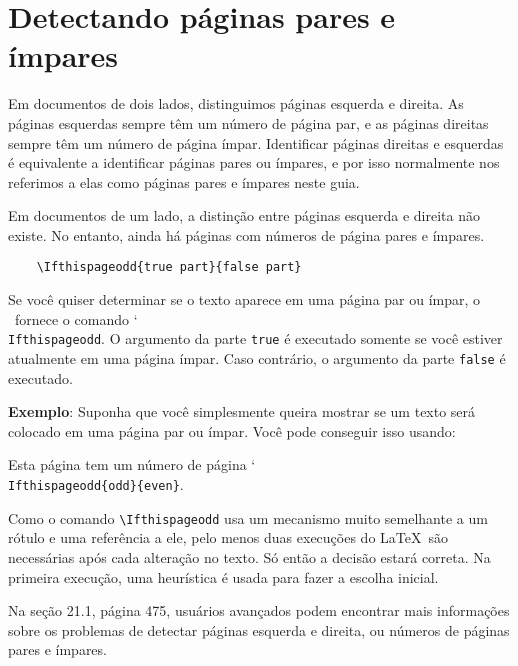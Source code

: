 \chapter{Detectando páginas pares e ímpares}
Em documentos de dois lados, distinguimos páginas esquerda e direita. As páginas esquerdas sempre têm um número de página par, e as páginas direitas sempre têm um número de página ímpar. Identificar páginas direitas e esquerdas é equivalente a identificar páginas pares ou ímpares, e por isso normalmente nos referimos a elas como páginas pares e ímpares neste guia.

Em documentos de um lado, a distinção entre páginas esquerda e direita não existe. No entanto, ainda há páginas com números de página pares e ímpares.
\begin{verbatim}
    \Ifthispageodd{true part}{false part}
\end{verbatim}

Se você quiser determinar se o texto aparece em uma página par ou ímpar, o \KOMAScript\ fornece o comando \char`\\\texttt{If\-this\-page\-odd}. O argumento da parte \texttt{true} é executado somente se você estiver atualmente em uma página ímpar. Caso contrário, o argumento da parte \texttt{false} é executado.

\textbf{Exemplo}: Suponha que você simplesmente queira mostrar se um texto será colocado em uma página par ou ímpar. Você pode conseguir isso usando:

Esta página tem um número de página \char`\\\texttt{If\-this\-page\-odd\{odd\}\{even\}}.

Como o comando \verb|\Ifthispageodd| usa um mecanismo muito semelhante a um rótulo e uma referência a ele, pelo menos duas execuções do \LaTeX\ são necessárias após cada alteração no texto. Só então a decisão estará correta. Na primeira execução, uma heurística é usada para fazer a escolha inicial.

Na seção 21.1, página 475, usuários avançados podem encontrar mais informações sobre os problemas de detectar páginas esquerda e direita, ou números de páginas pares e ímpares.
